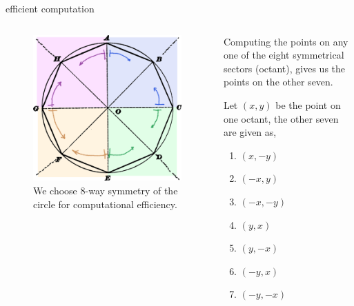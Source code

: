 \documentclass[aspectratio=169,xcolor={dvipsnames,svgnames}]{beamer}
\begin{document}
\begin{frame}[label={sec:orga6a893f}]{efficient computation}
\begin{columns}
\begin{column}{.45\columnwidth}
\begin{figure}[htbp]
\centering
\includegraphics[width=.9\linewidth]{images/circle-8way.png}
\caption{We choose 8-way symmetry of the circle for computational efficiency.}
\end{figure}
\end{column}


\begin{column}{.55\columnwidth}
Computing the points on any one of the eight
symmetrical sectors (\alert{octant}), gives us the points on
the other seven.

Let \((x,y)\) be the point on one octant, the other seven
are given as,
\begin{enumerate}
\item \((x,-y)\)
\item \((-x,y)\)
\item \((-x,-y)\)
\item \((y,x)\)
\item \((y,-x)\)
\item \((-y,x)\)
\item \((-y,-x)\)
\end{enumerate}
\end{column}
\end{columns}
\end{frame}
\end{document}
